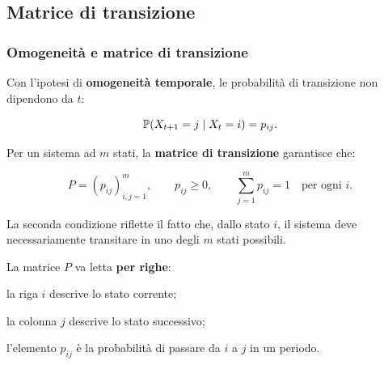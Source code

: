 

\subsection{Matrice di transizione}%

\begin{frame}%
%

\frametitle{Omogeneit\`{a} e matrice di transizione}%
%

%


Con l'ipotesi di \textbf{omogeneit\`{a} temporale}, le probabilit\`{a} di
transizione non dipendono da $t$:%

\[
\mathbb{P}(X_{t+1}=j \mid X_{t}=i)=p_{ij}.
\]


Per un sistema ad $m$ stati, la \textbf{matrice di transizione} garantisce che:%

\[
P=(p_{ij})_{i,j=1}^{m}, \qquad p_{ij}\geq0, \qquad\sum_{j=1}^{m} p_{ij}=1
\quad\text{per ogni } i.
\]


La seconda condizione riflette il fatto che, dallo stato $i$, il sistema deve
necessariamente transitare in uno degli $m$ stati possibili.

\medskip

La matrice $P$ va letta \textbf{per righe}:

\begin{stepitemize}
\item la riga $i$ descrive lo stato corrente;

\item la colonna $j$ descrive lo stato successivo;

\item l'elemento $p_{ij}$ \`{e} la probabilit\`{a} di passare da $i$ a $j$ in
un periodo.
\end{stepitemize}

%

\transboxout
\end{frame}%


